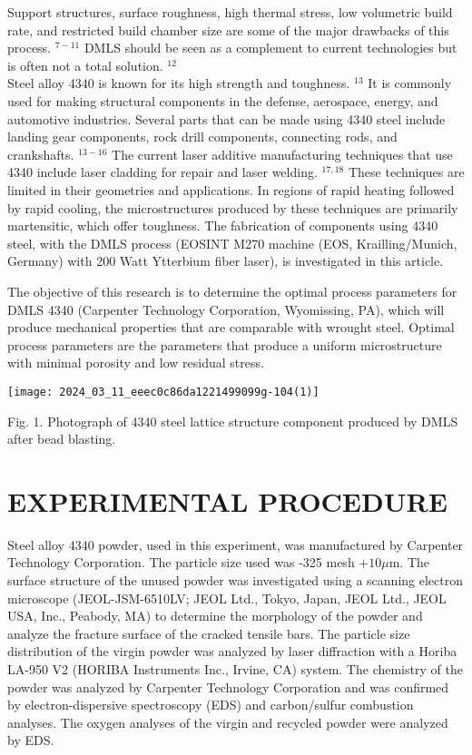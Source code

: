 \documentclass[10pt]{article}
\begin{document}
Support structures, surface roughness, high thermal stress, low volumetric build rate, and restricted build chamber size are some of the major drawbacks of this process. ${ }^{7-11}$ DMLS should be seen as a complement to current technologies but is often not a total solution. ${ }^{12}$\\
Steel alloy 4340 is known for its high strength and toughness. ${ }^{13}$ It is commonly used for making structural components in the defense, aerospace, energy, and automotive industries. Several parts that can be made using 4340 steel include landing gear components, rock drill components, connecting rods, and crankshafts. ${ }^{13-16}$ The current laser additive manufacturing techniques that use 4340 include laser cladding for repair and laser welding. ${ }^{17,18}$ These techniques are limited in their geometries and applications. In regions of rapid heating followed by rapid cooling, the microstructures produced by these techniques are primarily martensitic, which offer toughness. The fabrication of components using 4340 steel, with the DMLS process (EOSINT M270 machine (EOS, Krailling/Munich, Germany) with 200 Watt Ytterbium fiber laser), is investigated in this article.

The objective of this research is to determine the optimal process parameters for DMLS 4340 (Carpenter Technology Corporation, Wyomissing, PA), which will produce mechanical properties that are comparable with wrought steel. Optimal process parameters are the parameters that produce a uniform microstructure with minimal porosity and low residual stress.

\begin{center}
\texttt{[image: 2024\_03\_11\_eeec0c86da1221499099g-104(1)]}
\end{center}

Fig. 1. Photograph of 4340 steel lattice structure component produced by DMLS after bead blasting.

\section*{EXPERIMENTAL PROCEDURE}
Steel alloy 4340 powder, used in this experiment, was manufactured by Carpenter Technology Corporation. The particle size used was -325 mesh $+10 \mu \mathrm{m}$. The surface structure of the unused powder was investigated using a scanning electron microscope (JEOL-JSM-6510LV; JEOL Ltd., Tokyo, Japan, JEOL Ltd., JEOL USA, Inc., Peabody, MA) to determine the morphology of the powder and analyze the fracture surface of the cracked tensile bars. The particle size distribution of the virgin powder was analyzed by laser diffraction with a Horiba LA-950 V2 (HORIBA Instruments Inc., Irvine, CA) system. The chemistry of the powder was analyzed by Carpenter Technology Corporation and was confirmed by electron-dispersive spectroscopy (EDS) and carbon/sulfur combustion analyses. The oxygen analyses of the virgin and recycled powder were analyzed by EDS.
\end{document}
